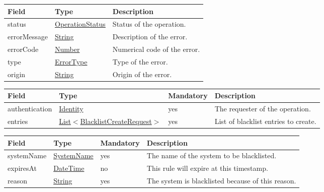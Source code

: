 \documentclass[a4paper]{arrowhead}
\newcommand{\pref}[1]{{\textcolor{ArrowheadGrey}{\hyperref[sec:model:primitives:#1]{#1}}}}
\begin{document}

\begin{table}[ht!]
\begin{tabularx}{\textwidth}{| p{4.25cm} | p{3.5cm} | X |} \hline
\rowcolor{gray!33} Field & Type      & Description \\ \hline
status & \pref{OperationStatus} & Status of the operation. \\ \hline
errorMessage & \pref{String} & Description of the error. \\ \hline
errorCode &\pref{Number}  & Numerical code of the error. \\ \hline
type & \pref{ErrorType} & Type of the error. \\ \hline
origin & \pref{String} & Origin of the error. \\ \hline
\end{tabularx}
\end{table}

\clearpage

 
\begin{table}[ht!]
\begin{tabularx}{\textwidth}{| p{3cm} | p{5cm} | p{2cm} | X |} \hline
\rowcolor{gray!33} Field & Type & Mandatory & Description \\ \hline
authentication & \hyperref[sec:model:Identity]{Identity} & yes & The requester of the operation. \\ \hline
entries & \pref{List}$<$\hyperref[sec:model:BlacklistCreateRequest]{BlacklistCreateRequest}$>$ & yes & List of blacklist entries to create. \\ \hline
\end{tabularx}
\end{table}

 
\begin{table}[ht!]
\begin{tabularx}{\textwidth}{| p{3cm} | p{5cm} | p{2cm} | X |} \hline
\rowcolor{gray!33} Field & Type & Mandatory & Description \\ \hline
systemName & \pref{SystemName} & yes & The name of the system to be blacklisted. \\ \hline
expiresAt & \pref{DateTime} & no & This rule will expire at this timestamp. \\ \hline
reason & \pref{String} & yes & The system is blacklisted because of this reason. \\ \hline
\end{tabularx}
\end{table}
\end{document}
